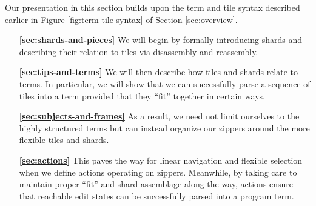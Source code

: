 Our presentation in this section builds upon the term and tile syntax
described earlier in Figure \ref{fig:term-tile-syntax} of
Section \ref{sec:overview}.
\begin{enumerate}
  \item[\textbf{\ref{sec:shards-and-pieces}}]
  We will begin by formally introducing shards
  and describing their relation to tiles via disassembly
  and reassembly.

  \item[\textbf{\ref{sec:tips-and-terms}}]
  We will then describe how tiles and shards relate to
  terms. In particular, we will show that
  we can successfully parse a sequence of tiles
  into a term provided that they ``fit'' together in
  certain ways.

  \item[\textbf{\ref{sec:subjects-and-frames}}]
  As a result, we need not limit ourselves to
  the highly structured terms
  but can instead organize our zippers around the
  more flexible tiles and shards.

  \item[\textbf{\ref{sec:actions}}]
  This paves the way for linear navigation and
  flexible selection when we define actions operating
  on zippers.
  Meanwhile, by taking care to
  maintain proper ``fit'' and shard assemblage along the
  way, actions ensure that reachable edit states can
  be successfully parsed into a program term.

\end{enumerate}





